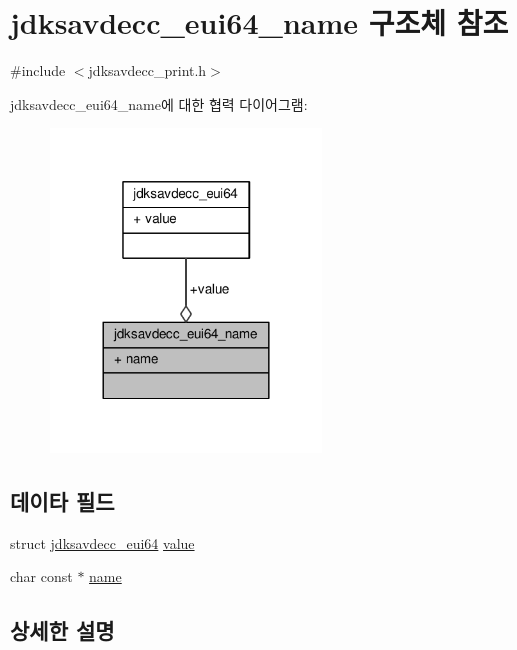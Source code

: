 \hypertarget{structjdksavdecc__eui64__name}{}\section{jdksavdecc\+\_\+eui64\+\_\+name 구조체 참조}
\label{structjdksavdecc__eui64__name}


{\ttfamily \#include $<$jdksavdecc\+\_\+print.\+h$>$}



jdksavdecc\+\_\+eui64\+\_\+name에 대한 협력 다이어그램\+:
\nopagebreak
\begin{figure}[H]
\begin{center}
\leavevmode
\includegraphics[width=204pt]{structjdksavdecc__eui64__name__coll__graph}
\end{center}
\end{figure}
\subsection*{데이타 필드}
\begin{DoxyCompactItemize}
\item 
struct \hyperlink{structjdksavdecc__eui64}{jdksavdecc\+\_\+eui64} \hyperlink{structjdksavdecc__eui64__name_a4325a443552fab7c52e139a35145c6f9}{value}
\item 
char const $\ast$ \hyperlink{structjdksavdecc__eui64__name_a5f1de76dd5d451949e12c0fbc966ca70}{name}
\end{DoxyCompactItemize}


\subsection{상세한 설명}


